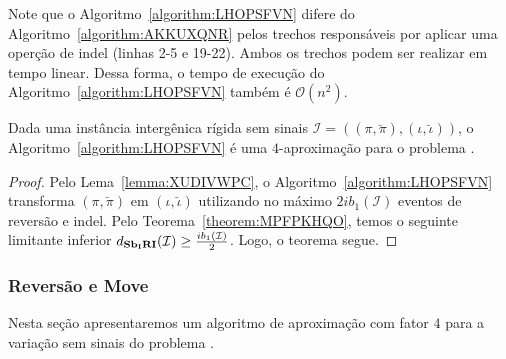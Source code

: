 Note que o Algoritmo~\ref{algorithm:LHOPSFVN} difere do Algoritmo~\ref{algorithm:AKKUXQNR} pelos trechos responsáveis por aplicar uma operção de indel (linhas 2-5 e 19-22). Ambos os trechos podem ser realizar em tempo linear. Dessa forma, o tempo de execução do Algoritmo~\ref{algorithm:LHOPSFVN} também é $\mathcal{O}(n^2)$.

\begin{theorem}\label{theorem:AFAHUIUF}
Dada uma instância intergênica rígida sem sinais $\mathcal{I}=((\pi,\breve\pi),(\iota,\breve\iota))$, o Algoritmo~\ref{algorithm:LHOPSFVN} é uma $4$-aproximação para o problema \SbIRI{}.
\end{theorem}
\begin{proof}
Pelo Lema~\ref{lemma:XUDIVWPC}, o Algoritmo~\ref{algorithm:LHOPSFVN} transforma $(\pi,\breve\pi)$ em $(\iota,\breve\iota)$ utilizando no máximo $2ib_1(\mathcal{I})$ eventos de reversão e indel. Pelo Teorema~\ref{theorem:MPFPKHQO}, temos o seguinte limitante inferior $d_{\textbf{Sb\textsubscript{I}RI}}(\mathcal{I}) \ge \frac{ib_1(\mathcal{I})}{2}$. Logo, o teorema segue. 
\end{proof}

\subsubsection{Reversão e Move}

Nesta seção apresentaremos um algoritmo de aproximação com fator $4$ para a variação sem sinais do problema \SbIRM{}.

